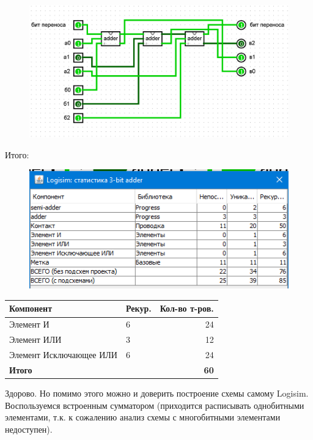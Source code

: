 \begin{figure}[H]
    \centering
    \includegraphics[width=1\linewidth]{Progress/3bit-adder1.png}
\end{figure}
Итого:
\begin{figure}[H]
    \centering
    \includegraphics[width=0.75\linewidth]{Progress/3bit-adder2.png}
\end{figure}
\begin{table}[H]
    \centering
    \begin{tabular}{@{}llr@{}}
        \toprule
        \textbf{Компонент}                    & \textbf{Рекур.} & \textbf{Кол-во т-ров.} \\ \midrule
        Элемент И                            & 6               & 24                    \\
        Элемент ИЛИ                          & 3               & 12                    \\
        Элемент Исключающее ИЛИ              & 6               & 24                    \\ \midrule
        \textbf{Итого}                       &                 & \textbf{60}          \\ 
        \bottomrule
    \end{tabular}
\end{table}
Здорово. Но помимо этого можно и доверить построение схемы самому Logisim.
Воспользуемся встроенным сумматором (приходится расписывать однобитными элементами, т.к. к сожалению анализ схемы с многобитными элементами недоступен).
